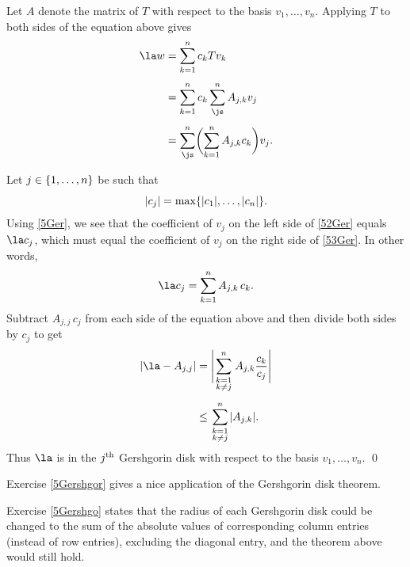 Let $A$ denote the matrix of $T$ with respect to the basis $v_1, \ldots, v_n$.
Applying $T$ to both sides of the equation above gives
\begin{align}
\la w &= \sum_{k=1}^n c_k Tv_k \label{52Ger} \\[4bp]
&= \sum_{k=1}^n c_k \sum_{\js}^n A_{j,k} v_j \notag \\[4bp]
&= \sum_{\js}^n \paren[\bigg] { \sum_{k=1}^n A_{j,k} c_k } v_j. \label{53Ger}
\end{align}

Let $j \in \{1, \ldots, n\}$ be such that
\[
\lvert c_j\rvert = \max\{ \lvert c_1\rvert, \ldots, \lvert c_n\rvert \}.
\]
Using \ref{5Ger}, we see that the coefficient of $v_j$ on the left side of \ref{52Ger} equals $\la c_j$, which must equal the coefficient of $v_j$ on the right side of \ref{53Ger}. In other words,
\[
\la c_j = \sum_{k=1}^n A_{j,k} \, c_k.
\]
Subtract $A_{j,j} \, c_j$ from each side of the equation above and then divide both sides by $c_j$ to get
\vspace{-.1in}
\begin{align*}
\abs{ \la - A_{j,j} } &= \abs[\Bigg]{\sum_{\scriptstyle k=1 \atop \scriptstyle k\ne j}^n A_{j,k} \frac{c_k}{c_j}} \\[5bp]
&\le \sum_{\scriptstyle k=1 \atop \scriptstyle k\ne j}^n \abs{A_{j,k}}.
\end{align*}
Thus $\la$ is in the $j^{\text{{th}}}$ Gershgorin disk with respect to the basis $v_1, \ldots, v_n$.
\qed


Exercise \ref{5Gershgor} gives a nice application of the Gershgorin disk theorem.

Exercise \ref{5Gershgo} states that the radius of each Gershgorin disk could be changed to the sum of the absolute values of corresponding column entries (instead of row entries), excluding the diagonal entry, and the theorem above would still hold.


